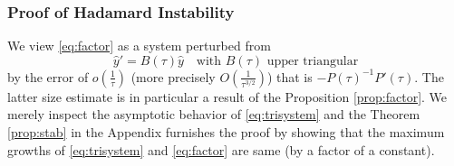 \documentclass[a4paper,11pt]{article}
\theoremstyle{remark}
\begin{document}
\subsubsection{Proof of Hadamard Instability}

We view \eqref{eq:factor} as a system perturbed from
\begin{equation} \label{eq:trisystem}
  \hat{y}' = B(\tau)\hat{y} \quad \text{with $B(\tau)$ upper triangular}
\end{equation}
by the error of $o(\frac{1}{\tau})$ (more precisely $O(\frac{1}{\tau^{3/2}})$) that is $- P(\tau)^{-1}P'(\tau)$. The latter size estimate is in particular a result of the Proposition \ref{prop:factor}. We merely inspect the asymptotic behavior of \eqref{eq:trisystem} and the Theorem \ref{prop:stab} in the Appendix furnishes the proof by showing that the maximum growths of \eqref{eq:trisystem} and \eqref{eq:factor} are same (by a factor of a constant). %
\end{document}
